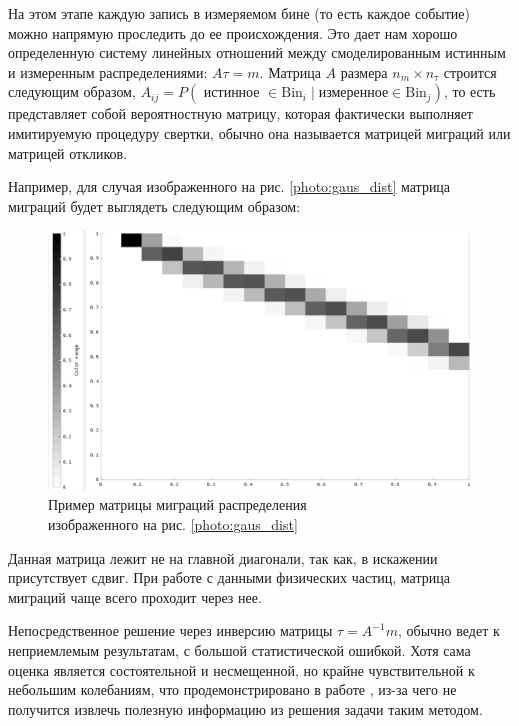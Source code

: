 \documentclass[a4paper,12pt]{diplom}
\begin{document}
На этом этапе каждую запись в измеряемом бине (то есть каждое событие) можно напрямую проследить до ее происхождения. 
Это дает нам хорошо определенную систему линейных отношений между смоделированным истинным и измеренным распределениями: 
$A\tau = m$. Матрица $A$ размера $n_{m} \times n_{\tau}$ строится следующим образом, 
$A_{ij} = P( \text{ истинное } \in \text{Bin}_{i} \mid \text{измеренное} \in \text{Bin}_{j} )$, 
то есть представляет собой вероятностную матрицу, которая фактически выполняет имитируемую процедуру свертки, обычно она называется матрицей
миграций или матрицей откликов.

Например, для случая изображенного на рис. \eqref{photo:gaus_dist} матрица миграций будет выглядеть следующим образом:

\begin{figure}[!ht]
   \includegraphics[width=\linewidth]{images/gaus_mig_black.png}
   \caption{Пример матрицы миграций распределения \\ изображенного на рис. \eqref{photo:gaus_dist} }
   \label{photo:gaus_mig}
\end{figure}

Данная матрица лежит не на главной диагонали, так как, в искажении присутствует сдвиг. При работе с данными физических частиц, 
матрица миграций чаще всего проходит через нее.

Непосредственное решение через инверсию матрицы $\tau = A^{-1} m$, обычно ведет к неприемлемым результатам, с большой статистической
ошибкой. Хотя сама оценка является состоятельной и несмещенной, но крайне чувствительной к небольшим колебаниям, что продемонстрировано 
в работе \cite{SvdHocker}, из-за чего не получится извлечь полезную информацию из решения задачи таким методом.
\end{document}
